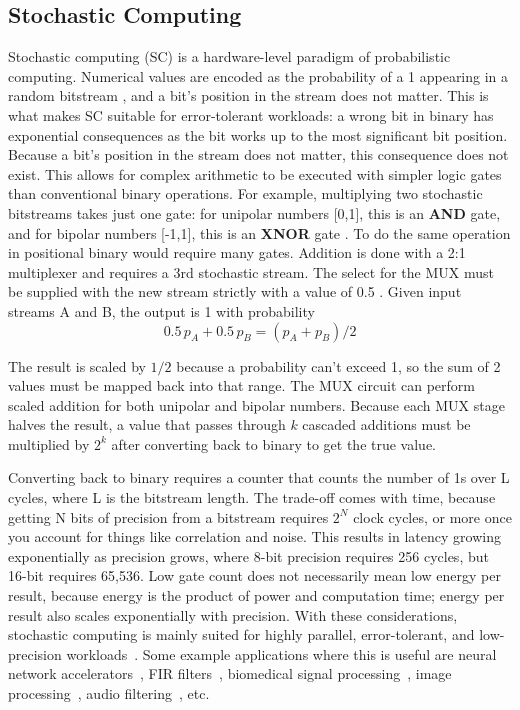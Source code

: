 \documentclass[conference]{IEEEtran}
\begin{document}
\subsection{Stochastic Computing}
Stochastic computing (SC) is a hardware-level paradigm of probabilistic computing.
Numerical values are encoded as the probability of a 1 appearing in a random bitstream
\cite{stochastic_computing},
and a bit's position in the stream does not matter. This is what makes SC suitable
for error-tolerant workloads: a wrong bit in binary has exponential consequences as the
bit works up to the most significant bit position. Because a bit's position in the
stream does not matter, this consequence does not exist.
This allows for complex arithmetic
to be executed with simpler logic gates than conventional binary operations.
For example, multiplying two stochastic bitstreams takes just one gate:
for unipolar numbers [0,1], this is an \textbf{AND} gate, and
for bipolar numbers [-1,1], this is an \textbf{XNOR} gate \cite{stochastic_computing_systems}.
To do the same operation in positional binary would require many gates.
Addition is done with a 2:1 multiplexer and requires a 3rd stochastic stream. The
select for the MUX must be supplied with the new stream strictly with a value of 0.5
\cite{stochastic_computing_systems}. Given input streams A and B, the output is 1
with probability \cite{stochastic_computing_systems}
\begin{equation}
    0.5\,p_A + 0.5\,p_B = (p_A + p_B)/2
\end{equation}

The result is scaled by $1/2$ because a probability can't exceed 1, so the sum of
2 values must be mapped back into that range. The MUX circuit can perform scaled addition
for both unipolar and bipolar numbers. Because each MUX stage halves the result, a value that passes through $k$ cascaded
additions must be multiplied by $2^k$ after converting back to binary to get the true value.

Converting back to binary requires a counter that counts the number of 1s over L cycles,
where L is the bitstream length.
The trade-off comes with time, because getting N bits of precision from
a bitstream requires $2^N$ clock cycles, or more once you account for things like correlation
and noise. This results in latency growing exponentially as precision grows, where
8-bit precision requires 256 cycles, but 16-bit requires 65,536. Low gate count
does not necessarily mean low energy per result, because energy is the product of
power and computation time; energy per result also scales exponentially with precision.
With these considerations, stochastic computing is mainly suited for highly parallel,
error-tolerant, and low-precision workloads~\cite{manohar2015}.
Some example applications where this is useful are neural network accelerators~\cite{nna},
FIR filters~\cite{firfilters}, biomedical signal processing~\cite{biomedical},
image processing~\cite{imageprocessing}, audio filtering~\cite{audiofiltering}, etc.
\end{document}
